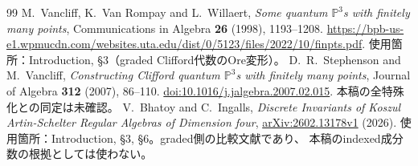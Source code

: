 \documentclass[11pt,a4paper]{ltjsarticle}
\theoremstyle{definition}
\begin{document}
\begin{thebibliography}{99}
M.~Vancliff, K.~Van Rompay and L.~Willaert,
\emph{Some quantum $\mathbb P^3$s with finitely many points},
Communications in Algebra \textbf{26} (1998), 1193--1208.
\url{https://bpb-us-e1.wpmucdn.com/websites.uta.edu/dist/0/5123/files/2022/10/finpts.pdf}.
使用箇所：Introduction, \S3（graded Clifford代数のOre変形）。
D.~R.~Stephenson and M.~Vancliff,
\emph{Constructing Clifford quantum $\mathbb P^3$s with finitely many points},
Journal of Algebra \textbf{312} (2007), 86--110.
\href{https://doi.org/10.1016/j.jalgebra.2007.02.015}{doi:10.1016/j.jalgebra.2007.02.015}.
本稿の全特殊化との同定は未確認。
V.~Bhatoy and C.~Ingalls,
\emph{Discrete Invariants of Koszul Artin-Schelter Regular Algebras of Dimension four},
\href{https://arxiv.org/abs/2602.13178v1}{arXiv:2602.13178v1} (2026).
使用箇所：Introduction, \S3, \S6。graded側の比較文献であり、
本稿のindexed成分数の根拠としては使わない。


\end{thebibliography}
\end{document}
